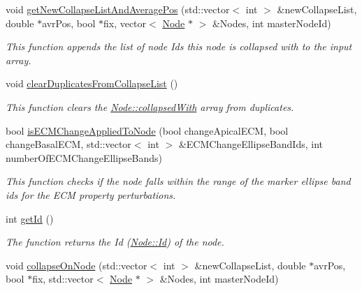 \begin{DoxyCompactItemize}
\hypertarget{classNode_a6761411f4226c354f2c117560f93a373}{}void \hyperlink{classNode_a6761411f4226c354f2c117560f93a373}{get\+New\+Collapse\+List\+And\+Average\+Pos} (std\+::vector$<$ int $>$ \&new\+Collapse\+List, double $\ast$avr\+Pos, bool $\ast$fix, vector$<$ \hyperlink{classNode}{Node} $\ast$ $>$ \&Nodes, int master\+Node\+Id)\label{classNode_a6761411f4226c354f2c117560f93a373}

\begin{DoxyCompactList}\small\item\em This function appends the list of node Ids this node is collapsed with to the input array. \end{DoxyCompactList}\item 
\hypertarget{classNode_a7256e876aa188a55e16ef5df1aa89c0f}{}void \hyperlink{classNode_a7256e876aa188a55e16ef5df1aa89c0f}{clear\+Duplicates\+From\+Collapse\+List} ()\label{classNode_a7256e876aa188a55e16ef5df1aa89c0f}

\begin{DoxyCompactList}\small\item\em This function clears the \hyperlink{classNode_a099baa33319712e8ff03063385f8e095}{Node\+::collapsed\+With} array from duplicates. \end{DoxyCompactList}\item 
\hypertarget{classNode_abf7a4917252fff90bd2ff2c50bfc5d21}{}bool \hyperlink{classNode_abf7a4917252fff90bd2ff2c50bfc5d21}{is\+E\+C\+M\+Change\+Applied\+To\+Node} (bool change\+Apical\+E\+C\+M, bool change\+Basal\+E\+C\+M, std\+::vector$<$ int $>$ \&E\+C\+M\+Change\+Ellipse\+Band\+Ids, int number\+Of\+E\+C\+M\+Change\+Ellipse\+Bands)\label{classNode_abf7a4917252fff90bd2ff2c50bfc5d21}

\begin{DoxyCompactList}\small\item\em This function checks if the node falls within the range of the marker ellipse band ids for the E\+C\+M property perturbations. \end{DoxyCompactList}\item 
int \hyperlink{classNode_a3c7b8ccf4dab44216b997c5f63f11d9f}{get\+Id} ()
\begin{DoxyCompactList}\small\item\em The function returns the Id (\hyperlink{classNode_a1bd379569cc1a8b96432e61971aed4d9}{Node\+::\+Id}) of the node. \end{DoxyCompactList}\item 
\hypertarget{classNode_adc2de7b09bea87a469266d0905561d21}{}void \hyperlink{classNode_adc2de7b09bea87a469266d0905561d21}{collapse\+On\+Node} (std\+::vector$<$ int $>$ \&new\+Collapse\+List, double $\ast$avr\+Pos, bool $\ast$fix, std\+::vector$<$ \hyperlink{classNode}{Node} $\ast$ $>$ \&Nodes, int master\+Node\+Id)\label{classNode_adc2de7b09bea87a469266d0905561d21}


\end{DoxyCompactItemize}
